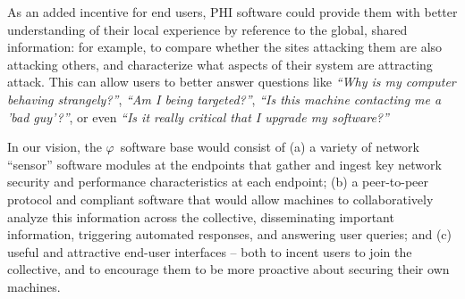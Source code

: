 \documentclass{acm_proc_article-sp}
\def\philogo{{\large $\varphi$}\xspace}
\begin{document}
As an added incentive for end users, PHI software could provide them with better understanding of their local experience by reference to the global, shared information: for example, to compare whether the sites attacking them are also attacking others, and characterize what aspects of their system are attracting attack. This can allow users to better answer questions like {\em ``Why is my computer behaving strangely?''}, {\em ``Am I being targeted?''}, {\em ``Is this machine contacting me a 'bad guy'?''}, or even {\em ``Is it really critical that I upgrade my software?''}

% 
In our vision, the \philogo\ software base would consist of (a) a variety of network ``sensor'' software modules at the endpoints that gather and ingest key network security and performance characteristics at each endpoint; (b) a peer-to-peer protocol and compliant software that would allow machines to collaboratively analyze this information across the collective, disseminating important information, triggering automated responses, and answering user queries; and (c) useful and attractive end-user interfaces -- both to incent users to join the collective, and to encourage them to be more proactive about securing their own machines.
\end{document}
